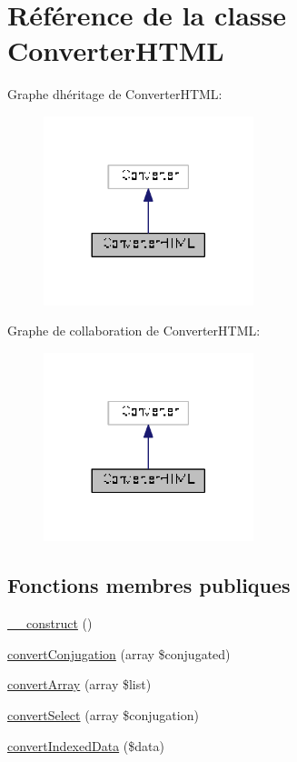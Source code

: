 \hypertarget{class_converter_h_t_m_l}{}\section{Référence de la classe Converter\+H\+T\+ML}
\label{class_converter_h_t_m_l}


Graphe d\textquotesingle{}héritage de Converter\+H\+T\+ML\+:
\nopagebreak
\begin{figure}[H]
\begin{center}
\leavevmode
\includegraphics[width=173pt]{class_converter_h_t_m_l__inherit__graph}
\end{center}
\end{figure}


Graphe de collaboration de Converter\+H\+T\+ML\+:
\nopagebreak
\begin{figure}[H]
\begin{center}
\leavevmode
\includegraphics[width=173pt]{class_converter_h_t_m_l__coll__graph}
\end{center}
\end{figure}
\subsection*{Fonctions membres publiques}
\begin{DoxyCompactItemize}
\item 
\hyperlink{class_converter_h_t_m_l_a036f13d611af2b8e6c24c73dfb3d60c4}{\+\_\+\+\_\+construct} ()
\item 
\hyperlink{class_converter_h_t_m_l_ad759ada61baaa9aa4f4c0f1d67182c05}{convert\+Conjugation} (array \$conjugated)
\item 
\hyperlink{class_converter_h_t_m_l_a62390602025ffe49e7b339a7782ddf72}{convert\+Array} (array \$list)
\item 
\hyperlink{class_converter_h_t_m_l_ae8152b5bc5d7a537c76e844df546dcbc}{convert\+Select} (array \$conjugation)
\item 
\hyperlink{class_converter_h_t_m_l_a8cda80b6e1312b5f11e47fc719a511b3}{convert\+Indexed\+Data} (\$data)
\end{DoxyCompactItemize}
